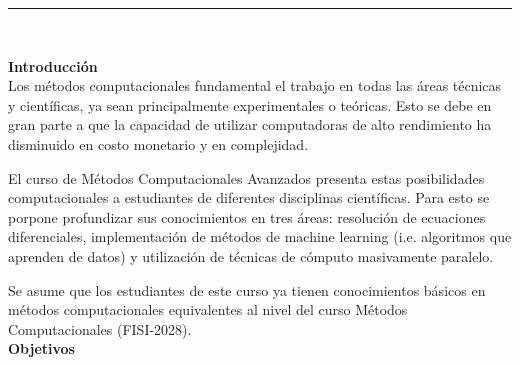 \documentclass[letterpaper,10pt,onecolumn]{article}
\begin{document}





\noindent\rule{\textwidth}{1pt}\\[-0.1cm]

\addtocounter{mysection}{1}

\noindent\textbf{\large {} \quad Introducci\'on}\\[-0.2cm]


\noindent\normalsize Los m\'etodos computacionales fundamental el
trabajo en todas las \'areas t\'ecnicas y cient\'ificas,
ya sean principalmente experimentales o te\'oricas. Esto se debe en
gran parte a que la capacidad de utilizar computadoras de alto
rendimiento ha disminuido en costo monetario y en complejidad.

El curso de M\'etodos Computacionales Avanzados presenta estas
posibilidades computacionales a estudiantes de diferentes disciplinas
cient\'ificas. Para esto se porpone profundizar sus conocimientos
en tres \'areas: resoluci\'on de ecuaciones diferenciales,
implementaci\'on de m\'etodos de machine learning (i.e. algoritmos que
aprenden de datos) y utilizaci\'on de t\'ecnicas de c\'omputo
masivamente paralelo.

Se asume que los estudiantes de este curso ya tienen conocimientos
b\'asicos en m\'etodos computacionales equivalentes al nivel del curso
M\'etodos Computacionales (FISI-2028).
\\[0.1cm]

\noindent\textbf{\large {} \quad Objetivos}\\[-0.2cm]
\end{document}
